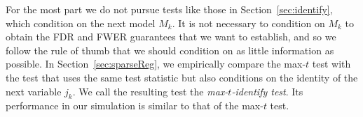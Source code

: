 \documentclass{article}
\begin{document}
For the most part we do not pursue tests like those in Section~\ref{sec:identify}, which condition on the next model $M_k$. It is not necessary to condition on $M_k$ to obtain the FDR and FWER guarantees that we want to establish, and so we follow the rule of thumb that we should condition on as little information as possible. In Section~\ref{sec:sparseReg}, we empirically compare the max-$t$ test with the test that uses the same test statistic but also conditions on the identity of the next variable $j_k$. We call the resulting test the {\em max-$t$-identify test}. Its performance in our simulation is similar to that of the max-$t$ test.

\end{document}
